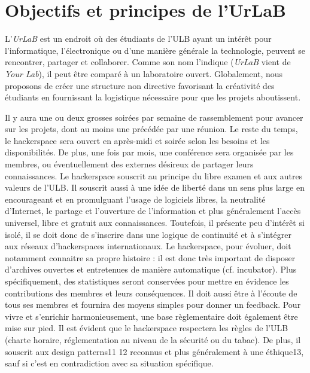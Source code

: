 \documentclass[a4paper]{article}
\begin{document}
\section{Objectifs et principes de l'UrLaB}
L'\emph{UrLaB} est  un endroit où des étudiants de l’ULB ayant un intérêt pour  l’informatique, l’électronique ou d’une manière générale la  technologie, peuvent se rencontrer, partager et collaborer. 
Comme  son nom l'indique (\emph{UrLaB} vient de \emph{Your Lab}), il peut être  comparé à un laboratoire ouvert. Globalement, nous proposons de créer  une structure non directive favorisant la créativité des étudiants en  fournissant la logistique nécessaire pour que les projets aboutissent.

Il y aura une ou deux grosses soirées par semaine de rassemblement pour avancer sur les projets,  dont au moins une précédée par une réunion. Le reste du temps, le  hackerspace sera ouvert en après-midi et soirée selon les besoins et  les disponibilités. De plus, une fois par mois, une conférence sera organisée par les membres, ou éventuellement des externes désireux de partager leurs connaissances.
Le  hackerspace souscrit au principe du libre examen et aux autres valeurs  de l’ULB. Il souscrit aussi à une idée de liberté dans un sens plus  large en encourageant et en promulguant l’usage de logiciels libres, la  neutralité d’Internet, le partage et l’ouverture de l’information et  plus généralement l’accès universel, libre et gratuit aux  connaissances.
Toutefois, il présente peu d’intérêt si isolé, il se doit donc de s’inscrire dans une logique de continuité et à s’intégrer aux réseaux d’hackerspaces internationaux.
Le  hackerspace, pour évoluer, doit notamment connaitre sa propre histoire  : il est donc très important de disposer d’archives ouvertes et  entretenues de manière automatique (cf. incubator). Plus  spécifiquement, des statistiques seront conservées pour mettre en  évidence les contributions des membres et leurs conséquences. Il doit  aussi être à l’écoute de tous ses membres et fournira des moyens  simples pour donner un feedback. Pour vivre et s’enrichir  harmonieusement, une base règlementaire doit également être mise sur pied.  Il est évident que le hackerspace respectera les règles de l’ULB  (charte horaire, réglementation au niveau de la sécurité ou du  tabac). De plus, il souscrit aux design patterns11 12 reconnus et plus  généralement à une éthique13, sauf si c’est en contradiction avec sa  situation spécifique.
\end{document}
